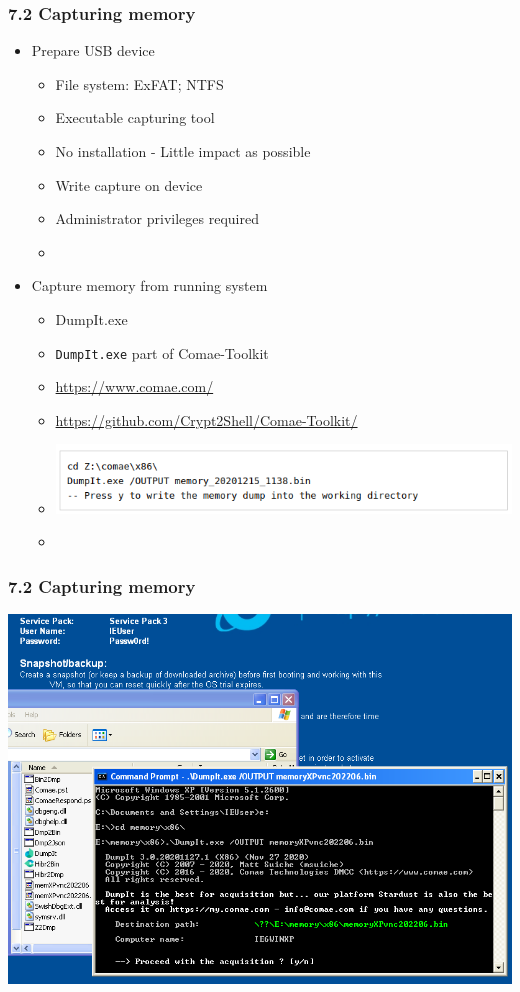 \begin{frame}
  \frametitle{7.2 Capturing memory}
    \begin{itemize}
        \item Prepare USB device
            \begin{itemize}
                    \item[] File system: ExFAT; NTFS
                    \item[] Executable capturing tool
                    \item[] No installation - Little impact as possible
                    \item[] Write capture on device
                    \item[] Administrator privileges required
                    \item[]
            \end{itemize} 
        \item Capture memory from running system
            \begin{itemize}
                    \item[] DumpIt.exe
                    \item[] \texttt{DumpIt.exe} part of Comae-Toolkit
                    \item[] \url{https://www.comae.com/}
                    \item[] \url{https://github.com/Crypt2Shell/Comae-Toolkit/}
                    \item[] \includegraphics[scale=0.55]{images/dumpCmd.png}
                    \item[]
            \end{itemize} 
    \end{itemize}
\end{frame}


\begin{frame}
  \frametitle{7.2 Capturing memory}
      \includegraphics[scale=0.36]{images/dumpIt.png}
\end{frame}


